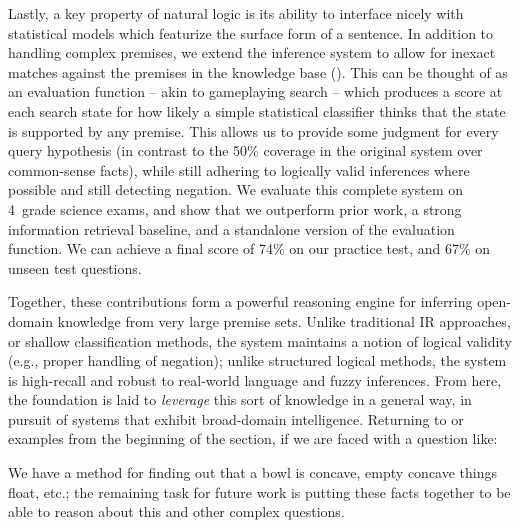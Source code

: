 %
%
Lastly, a key property of natural logic is its ability to interface nicely with 
  statistical models which featurize the surface form of a sentence.
In addition to handling complex premises, we extend the inference system to 
  allow for inexact matches against the premises in the knowledge base 
  ().
This can be thought of as an evaluation function -- akin to gameplaying search -- 
  which produces a score at each search state for how likely a simple statistical 
  classifier thinks that the state is supported by any premise.
This allows us to provide some judgment for every query hypothesis (in contrast 
  to the 50\% coverage in the original system over common-sense facts), 
  while still adhering to logically valid 
  inferences where possible and still detecting negation.
We evaluate this complete system on 4\nth\ grade science exams, and show that we 
  outperform prior work, a strong information retrieval baseline, and a 
  standalone version of the evaluation function.
We can achieve a final score of 74\% on our practice test, and 67\% on unseen 
  test questions.



%
%
Together, these contributions form a powerful reasoning engine for inferring open-domain
  knowledge from very large premise sets.
Unlike traditional IR approaches, or shallow classification methods, the system maintains
  a notion of logical validity (e.g., proper handling of negation);
  unlike structured logical methods, the system is high-recall and robust to
  real-world language and fuzzy inferences.
From here, the foundation is laid to \textit{leverage} this sort of knowledge in a
  general way, in pursuit of systems that exhibit broad-domain intelligence.
Returning to or examples from the beginning of the section, if we are faced with a question like:

\begin{displayquote}
\end{displayquote}

We have a method for finding out that a bowl is concave, empty concave things float, etc.;
  the remaining task for future work is putting these facts together to be able to reason about
  this and other complex questions.
